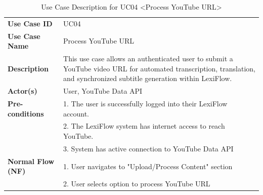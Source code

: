 \documentclass[oneside]{utmthesis}
\begin{document}
\begin{longtable}{|>{\columncolor[HTML]{D9D9D9}}l|p{10cm}|}
    \caption{Use Case Description for UC04 \textless{}Process YouTube URL\textgreater{}}\label{tab:use_case_uc04}
    {}                                                                                                                                                                                                        \\
    \hline
    \textbf{Use Case ID}           & UC04                                                                                                                                                                     \\
    \hline
    \textbf{Use Case Name}         & Process YouTube URL                                                                                                                                                      \\
    \hline
    \textbf{Description}           & This use case allows an authenticated user to submit a YouTube video URL for automated transcription, translation, and synchronized subtitle generation within LexiFlow. \\
    \hline
    \textbf{Actor(s)}              & User, YouTube Data API                                                                                                                                                   \\
    \hline
    \textbf{Pre-conditions}        &
    1. The user is successfully logged into their LexiFlow account.                                                                                                                                           \\
                                   & 2. The LexiFlow system has internet access to reach YouTube.                                                                                                             \\
                                   & 3. System has active connection to YouTube Data API                                                                                                                      \\
    \hline
    \textbf{Normal Flow (NF)}      &
    1. User navigates to "Upload/Process Content" section                                                                                                                                                     \\
                                   & 2. User selects option to process YouTube URL                                                                                                                            \\

\end{longtable}
\end{document}
